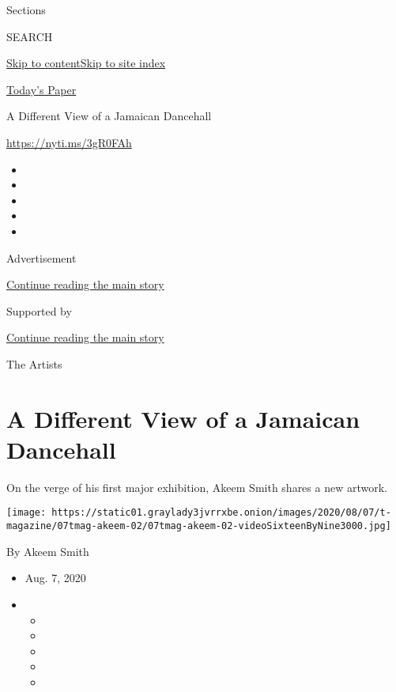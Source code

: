 Sections

SEARCH

\protect\hyperlink{site-content}{Skip to
content}\protect\hyperlink{site-index}{Skip to site index}

\href{https://myaccount.nytimes3xbfgragh.onion/auth/login?response_type=cookie\&client_id=vi}{}

\href{https://www.nytimes3xbfgragh.onion/section/todayspaper}{Today's
Paper}

A Different View of a Jamaican Dancehall

\url{https://nyti.ms/3gR0FAh}

\begin{itemize}
\item
\item
\item
\item
\item
\end{itemize}

Advertisement

\protect\hyperlink{after-top}{Continue reading the main story}

Supported by

\protect\hyperlink{after-sponsor}{Continue reading the main story}

The Artists

\hypertarget{a-different-view-of-a-jamaican-dancehall}{%
\section{A Different View of a Jamaican
Dancehall}\label{a-different-view-of-a-jamaican-dancehall}}

On the verge of his first major exhibition, Akeem Smith shares a new
artwork.

\texttt{[image: https://static01.graylady3jvrrxbe.onion/images/2020/08/07/t-magazine/07tmag-akeem-02/07tmag-akeem-02-videoSixteenByNine3000.jpg]}

By Akeem Smith

\begin{itemize}
\item
  Aug. 7, 2020
\item
  \begin{itemize}
  \item
  \item
  \item
  \item
  \item
  \end{itemize}
\end{itemize}

